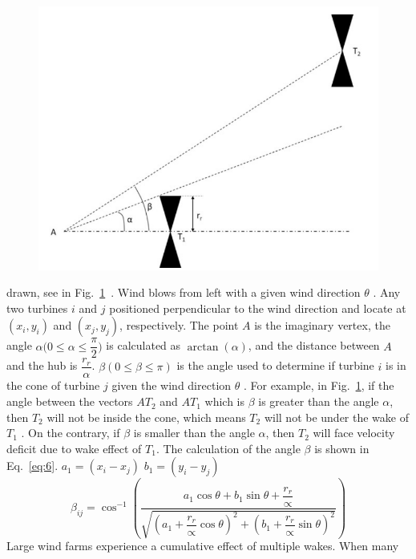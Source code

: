 \documentclass[]{iptconf}
\begin{document}
\begin{figure}[h!]
	\centering
	\includegraphics[width=0.9\columnwidth]{Pictures/Imaginary cone of a wind turbine.png}
	\label{fig:pic2}
\end{figure}
drawn, see in Fig.~\ref{fig:pic2}~\cite{Karasu2018}. Wind blows from left with a given wind direction $\theta$ . Any
two turbines $i$ and $j$ positioned perpendicular to the wind direction and locate at $(x_i,y_i)$ and $(x_j, y_j)$, respectively. 
The point $A$ is the imaginary vertex, the angle $\alpha\bigg(0\leqslant\alpha\leqslant\dfrac{\pi}{2}\bigg)$
is calculated as $\arctan(\alpha)$, and the distance between $A$ and the hub is $\dfrac{r_r}{\alpha}$.
$\beta(0\leqslant\beta\leqslant\pi)$ is the angle used to determine if turbine $i$ is in the cone of turbine $j$
given the wind direction $\theta$ . For example, in Fig.~\ref{fig:pic2}, if the angle between the vectors
$AT_2$ and $AT_1$ which is $\beta$ is greater than the angle $\alpha$, then $T_2$ will not be inside the
cone, which means $T_2$ will not be under the wake of $T_1$ . On the contrary, if $\beta$ is
smaller than the angle $\alpha$, then $T_2$ will face velocity deficit due to wake effect of $T_1$.
The calculation of the angle $\beta$ is shown in Eq.~\eqref{eq:6}. $a_1=(x_i-x_j)$ $b_1=(y_i-y_j)$
\begin{equation}
	\label{eq:6}
	\beta_{ij}=\cos^{-1}\left(\dfrac{a_1\cos\theta+b_1\sin\theta+\dfrac{r_r}{\propto}}{\sqrt{(a_1+\dfrac{r_r}{\propto}\cos\theta)^2+(b_1+\dfrac{r_r}{\propto}\sin\theta)^2}}\right)
\end{equation}
Large wind farms experience a cumulative effect of multiple wakes. When many
\end{document}
